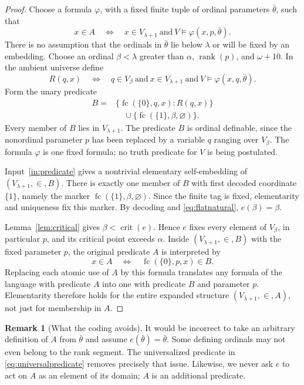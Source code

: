 \documentclass[11pt,letterpaper]{article}
\theoremstyle{definition}
\newtheorem{remark}[definition]{Remark}
\numberwithin{equation}{section}
\newcommand{\crit}{\operatorname{crit}}
\newcommand{\rank}{\operatorname{rank}}
\newcommand{\fc}{\operatorname{fc}}
\begin{document}
\begin{proof}
Choose a formula $\varphi$, with a fixed finite tuple of ordinal parameters $\bar\theta$, such that
\[
 x\in A\quad\Longleftrightarrow\quad
 x\in V_{\lambda+1}\ \text{and}\ V\models\varphi(x,p,\bar\theta).
\]
There is no assumption that the ordinals in $\bar\theta$ lie below $\lambda$ or will be fixed by an embedding. Choose an ordinal $\beta<\lambda$ greater than $\alpha$, $\rank(p)$, and $\omega+10$. In the ambient universe define
\[
 R(q,x)\quad\Longleftrightarrow\quad
 q\in V_\beta\ \text{and}\ x\in V_{\lambda+1}\ \text{and}\
 V\models\varphi(x,q,\bar\theta).
\]
Form the unary predicate
\begin{align}
 B={}&\{\fc(\{0\},q,x):R(q,x)\}\nonumber\\
 &\quad\cup\{\fc(\{1\},\beta,\varnothing)\}.\label{eq:universalpredicate}
\end{align}
Every member of $B$ lies in $V_{\lambda+1}$. The predicate $B$ is ordinal definable, since the nonordinal parameter $p$ has been replaced by a variable $q$ ranging over $V_\beta$. The formula $\varphi$ is one fixed formula; no truth predicate for $V$ is being postulated.

Input~\ref{in:predicate} gives a nontrivial elementary self-embedding of $(V_{\lambda+1},\in,B)$. There is exactly one member of $B$ with first decoded coordinate $\{1\}$, namely the marker $\fc(\{1\},\beta,\varnothing)$. Since the finite tag is fixed, elementarity and uniqueness fix this marker. By decoding and \eqref{eq:flatnatural}, $e(\beta)=\beta$.

Lemma~\ref{lem:critical} gives $\beta<\crit(e)$. Hence $e$ fixes every element of $V_\beta$, in particular $p$, and its critical point exceeds $\alpha$. Inside $(V_{\lambda+1},\in,B)$ with the fixed parameter $p$, the original predicate $A$ is interpreted by
\[
 x\in A\quad\Longleftrightarrow\quad
        \fc(\{0\},p,x)\in B.
\]
Replacing each atomic use of $A$ by this formula translates any formula of the language with predicate $A$ into one with predicate $B$ and parameter $p$. Elementarity therefore holds for the entire expanded structure $(V_{\lambda+1},\in,A)$, not just for membership in $A$.
\end{proof}

\begin{remark}[What the coding avoids]
It would be incorrect to take an arbitrary definition of $A$ from $\bar\theta$ and assume $e(\bar\theta)=\bar\theta$. Some defining ordinals may not even belong to the rank segment. The universalized predicate in \eqref{eq:universalpredicate} removes precisely that issue. Likewise, we never ask $e$ to act on $A$ as an element of its domain; $A$ is an additional predicate.
\end{remark}
\end{document}
